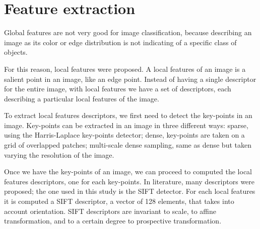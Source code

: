 \section{Feature extraction}



Global features are not very good for image classification, because describing an image as its color or edge distribution is not indicating of a specific class of objects.

For this reason, local features were proposed. A local features of an image is a salient point in an image, like an edge point. Instead of having a single descriptor for the entire image, with local features we have a set of descriptors, each describing a particular local features of the image.

To extract local features descriptors, we first need to detect the key-points in an image.
Key-points can be extracted in an image in three different ways: sparse, using the Harris-Laplace key-points detector; dense, key-points are taken on a grid of overlapped patches; multi-scale dense sampling, same as dense but taken varying the resolution of the image.

Once we have the key-points of an image, we can proceed to computed the local features descriptors, one for each key-points. In literature, many descriptors were proposed; the one used in this study is the SIFT detector. For each local features it is computed a SIFT descriptor, a vector of 128 elements, that takes into account orientation. SIFT descriptors are invariant to scale, to affine transformation, and to a certain degree to prospective transformation.